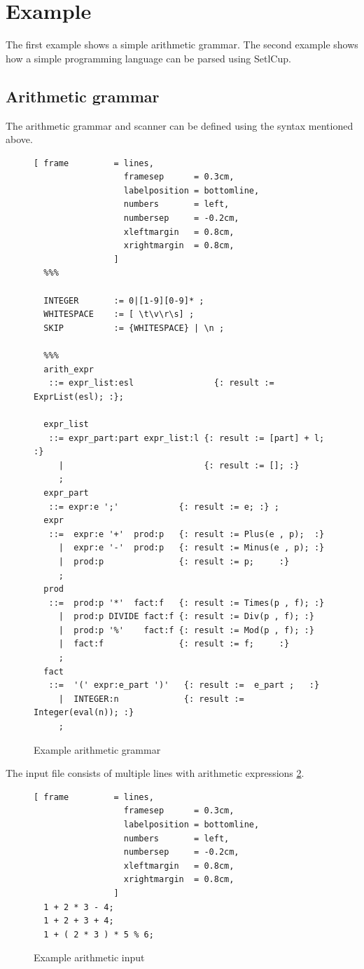 \section{Example}
The first example shows a simple arithmetic grammar.
The second example shows how a simple programming language can be parsed using SetlCup.
\subsection{Arithmetic grammar}
The arithmetic grammar and scanner  can be defined using the syntax mentioned above.
\begin{figure}[!ht]
\begin{Verbatim}[ frame         = lines, 
                  framesep      = 0.3cm, 
                  labelposition = bottomline,
                  numbers       = left,
                  numbersep     = -0.2cm,
                  xleftmargin   = 0.8cm,
                  xrightmargin  = 0.8cm,
                ]
  %%%

  INTEGER       := 0|[1-9][0-9]* ;
  WHITESPACE    := [ \t\v\r\s] ;
  SKIP          := {WHITESPACE} | \n ;

  %%%
  arith_expr 
   ::= expr_list:esl                {: result := ExprList(esl); :};

  expr_list 
   ::= expr_part:part expr_list:l {: result := [part] + l; :} 
     |                            {: result := []; :}
     ;
  expr_part 
   ::= expr:e ';'            {: result := e; :} ;
  expr 
   ::=  expr:e '+'  prod:p   {: result := Plus(e , p);  :} 
     |  expr:e '-'  prod:p   {: result := Minus(e , p); :} 
     |  prod:p               {: result := p;     :}
     ;
  prod 
   ::=  prod:p '*'  fact:f   {: result := Times(p , f); :}
     |  prod:p DIVIDE fact:f {: result := Div(p , f); :} 
     |  prod:p '%'    fact:f {: result := Mod(p , f); :} 
     |  fact:f               {: result := f;     :}
     ;
  fact 
   ::=  '(' expr:e_part ')'   {: result :=  e_part ;   :} 
     |  INTEGER:n             {: result := Integer(eval(n)); :} 
     ;
\end{Verbatim}
\caption{Example arithmetic grammar}
\label{fig:example_arithmetic_grammer}
\end{figure}
%
The input file consists of multiple lines with arithmetic expressions \ref{fig:example_arithmetic_input}.
\begin{figure}[!ht]
\begin{Verbatim}[ frame         = lines, 
                  framesep      = 0.3cm, 
                  labelposition = bottomline,
                  numbers       = left,
                  numbersep     = -0.2cm,
                  xleftmargin   = 0.8cm,
                  xrightmargin  = 0.8cm,
                ]
  1 + 2 * 3 - 4;
  1 + 2 + 3 + 4;
  1 + ( 2 * 3 ) * 5 % 6;
\end{Verbatim}
\caption{Example arithmetic input}
\label{fig:example_arithmetic_input}
\end{figure}
